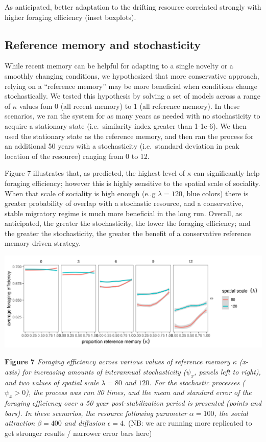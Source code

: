 \documentclass[12pt]{article}
\begin{document}
As anticipated, better adaptation to the drifting resource correlated
strongly with higher foraging efficiency (inset boxplots).

\hypertarget{reference-memory-and-stochasticity}{%
\subsection{Reference memory and
stochasticity}\label{reference-memory-and-stochasticity}}

While recent memory can be helpful for adapting to a single novelty or a
smoothly changing conditions, we hypothesized that more conservative
approach, relying on a ``reference memory'' may be more beneficial when
conditions change stochastically. We tested this hypothesis by solving a
set of models across a range of \(\kappa\) values fom 0 (all recent
memory) to 1 (all reference memory). In these scenarios, we ran the
system for as many years as needed with no stochasticity to acquire a
stationary state (i.e.~similarity index greater than 1-1e-6). We then
used the stationary state as the reference memory, and then ran the
process for an additional 50 years with a stochasticity (i.e.~standard
deviation in peak location of the resource) ranging from 0 to 12.

Figure 7 illustrates that, as predicted, the highest level of \(\kappa\)
can significantly help foraging efficiency; however this is highly
sensitive to the spatial scale of sociality. When that scale of
sociality is high enough (e..g \(\lambda = 120\), blue colors) there is
greater probability of overlap with a stochastic resource, and a
conservative, stable migratory regime is much more beneficial in the
long run. Overall, as anticipated, the greater the stochasticity, the
lower the foraging efficiency; and the greater the stochasticity, the
greater the benefit of a conservative reference memory driven strategy.

\includegraphics{figures/stochasticity.png}

\textbf{Figure 7} \emph{Foraging efficiency across various values of
reference memory \(\kappa\) (x-axis) for increasing amounts of
interannual stochasticity (\(\psi_x\), panels left to right), and two
values of spatial scale \(\lambda = 80\) and \(120\). For the stochastic
processes (\(\psi_x > 0\)), the process was run 30 times, and the mean
and standard error of the foraging efficiency over a 50 year
post-stabilization period is presented (points and bars). In these
scenarios, the resource following parameter \(\alpha = 100\), the social
attraction \(\beta = 400\) and diffusion \(\epsilon = 4\).} (NB: we are
running more replicated to get stronger results / narrower error bars
here)
\end{document}
